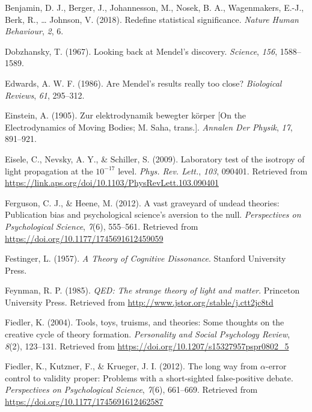 \documentclass[english,floatsintext,man]{apa6}
\theoremstyle{definition}
\theoremstyle{definition}
\theoremstyle{definition}
\theoremstyle{remark}
\begin{document}
\setlength{\parindent}{-0.5in}
\setlength{\leftskip}{0.5in}

\hypertarget{refs}{}
\leavevmode\hypertarget{ref-Benjamin:etal:2018}{}%
Benjamin, D. J., Berger, J., Johannesson, M., Nosek, B. A., Wagenmakers,
E.-J., Berk, R., \ldots{} Johnson, V. (2018). Redefine statistical
significance. \emph{Nature Human Behaviour}, \emph{2}, 6.

\leavevmode\hypertarget{ref-Dobzhansky:1967}{}%
Dobzhansky, T. (1967). Looking back at Mendel's discovery.
\emph{Science}, \emph{156}, 1588--1589.

\leavevmode\hypertarget{ref-Edwards:1986}{}%
Edwards, A. W. F. (1986). Are Mendel's results really too close?
\emph{Biological Reviews}, \emph{61}, 295--312.

\leavevmode\hypertarget{ref-Einstein:1905}{}%
Einstein, A. (1905). Zur elektrodynamik bewegter körper {[}On the
Electrodynamics of Moving Bodies; M. Saha, trans.{]}. \emph{Annalen Der
Physik}, \emph{17}, 891--921.

\leavevmode\hypertarget{ref-Eisele:etal:2009}{}%
Eisele, C., Nevsky, A. Y., \& Schiller, S. (2009). Laboratory test of
the isotropy of light propagation at the \(10^{-17}\) level. \emph{Phys.
Rev. Lett.}, \emph{103}, 090401. Retrieved from
\url{https://link.aps.org/doi/10.1103/PhysRevLett.103.090401}

\leavevmode\hypertarget{ref-Ferguson:Heene:2012}{}%
Ferguson, C. J., \& Heene, M. (2012). A vast graveyard of undead
theories: Publication bias and psychological science's aversion to the
null. \emph{Perspectives on Psychological Science}, \emph{7}(6),
555--561. Retrieved from \url{https://doi.org/10.1177/1745691612459059}

\leavevmode\hypertarget{ref-Festinger:1957}{}%
Festinger, L. (1957). \emph{A Theory of Cognitive Dissonance}. Stanford
University Press.

\leavevmode\hypertarget{ref-Feynman:1985}{}%
Feynman, R. P. (1985). \emph{QED: The strange theory of light and
matter}. Princeton University Press. Retrieved from
\url{http://www.jstor.org/stable/j.ctt2jc8td}

\leavevmode\hypertarget{ref-Fiedler:2004}{}%
Fiedler, K. (2004). Tools, toys, truisms, and theories: Some thoughts on
the creative cycle of theory formation. \emph{Personality and Social
Psychology Review}, \emph{8}(2), 123--131. Retrieved from
\url{https://doi.org/10.1207/s15327957pspr0802_5}

\leavevmode\hypertarget{ref-Fiedler:etal:2012}{}%
Fiedler, K., Kutzner, F., \& Krueger, J. I. (2012). The long way from
\(\alpha\)-error control to validity proper: Problems with a
short-sighted false-positive debate. \emph{Perspectives on Psychological
Science}, \emph{7}(6), 661--669. Retrieved from
\url{https://doi.org/10.1177/1745691612462587}
\end{document}
